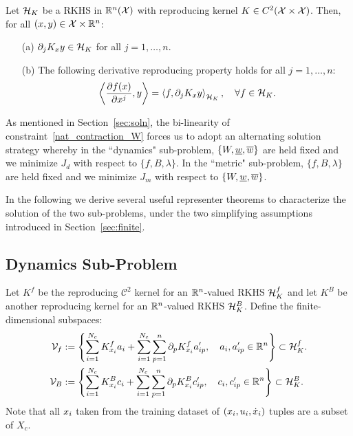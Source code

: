 \begin{theorem} \label{thm:RK_der}
Let $\mathcal{H}_{K}$ be a RKHS in $\mathbb{R}^n(\mathcal{X})$ with reproducing kernel $K \in C^2(\mathcal{X} \times \mathcal{X})$. Then, for all $(x,y) \in \mathcal{X} \times \mathbb{R}^n$:
\begin{enumerate}
	\item[(a)] $\partial_j K_x y \in \mathcal{H}_{K}$ for all $j = 1,\ldots,n$. 
	\item[(b)] The following derivative reproducing property holds for all $j = 1,\ldots, n$:
	\[
		\left\langle \dfrac{\partial f(x)}{\partial x^j}, y \right\rangle = \left\langle f,  \partial_j K_x y \right\rangle_{\mathcal{H}_{K}}, \quad \forall f \in \mathcal{H}_{K}.
	\]
\end{enumerate}
\end{theorem}

As mentioned in Section~\ref{sec:soln}, the bi-linearity of constraint~\eqref{nat_contraction_W} forces us to adopt an alternating solution strategy whereby in the ``dynamics" sub-problem, $\{W,\underline{w},\overline{w}\}$ are held fixed and we minimize $J_d$ with respect to $\{f,B,\lambda\}$. In the ``metric" sub-problem, $\{f,B,\lambda\}$ are held fixed and we minimize $J_m$ with respect to $\{W,\underline{w},\overline{w}\}$.

In the following we derive several useful representer theorems to characterize the solution of the two sub-problems, under the two simplifying assumptions introduced in Section~\ref{sec:finite}. 

\subsection{Dynamics Sub-Problem}\label{sec:dyn_sub}

Let $K^f$ be the reproducing $\mathcal{C}^2$ kernel for an $\mathbb{R}^n$-valued RKHS $\mathcal{H}_{K}^f$ and let $K^B$ be another reproducing kernel for an $\mathbb{R}^n$-valued RKHS $\mathcal{H}_{K}^B$. Define the finite-dimensional subspaces:
\begin{align}
	\mathcal{V}_{f} &:= \left\{ \sum_{i=1}^{N_c} K^f_{x_i} a_i + \sum_{i=1}^{N_c} \sum_{p=1}^{n} \partial_p K^f_{x_i} a'_{ip},\quad a_i, a'_{ip} \in \mathbb{R}^n \right\} \subset \mathcal{H}_{K}^f. \label{rep} \\
	\mathcal{V}_{B} &:= \left\{ \sum_{i=1}^{N_c} K^B_{x_i} c_i + \sum_{i=1}^{N_c} \sum_{p=1}^{n} \partial_p K^B_{x_i} c'_{ip},\quad c_i, c'_{ip} \in \mathbb{R}^n \right\} \subset \mathcal{H}_{K}^B.\label{rep_b}
\end{align}
Note that all $x_i$ taken from the training dataset of $(x_i,u_i,\dot{x}_i)$ tuples are a subset of $X_c$.

